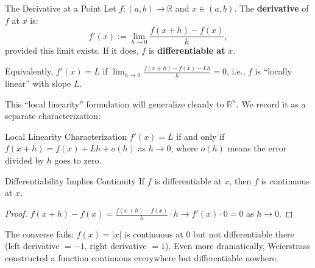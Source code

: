 \documentclass[12pt, openany]{book}
\theoremstyle{plain}
\theoremstyle{definition}
\theoremstyle{remark}
\newcommand{\R}{\mathbb{R}}
\begin{document}
\begin{defbox}{The Derivative at a Point}
Let $f : (a,b) \to \R$ and $x \in (a,b)$. The \textbf{derivative} of $f$ at $x$ is:
\[ f'(x) := \lim_{h \to 0} \frac{f(x+h) - f(x)}{h}, \]
provided this limit exists. If it does, $f$ is \textbf{differentiable at} $x$.

Equivalently, $f'(x) = L$ if $\lim_{h\to 0} \frac{f(x+h) - f(x) - Lh}{h} = 0$, i.e., $f$ is ``locally linear'' with slope $L$.
\end{defbox}
\color{black}

This ``local linearity'' formulation will generalize cleanly to $\R^n$. We record it as a separate characterization:

\begin{propbox}{Local Linearity Characterization}
$f'(x) = L$ if and only if $f(x + h) = f(x) + Lh + o(h)$ as $h \to 0$, where $o(h)$ means the error divided by $h$ goes to zero.
\end{propbox}
\color{black}

\begin{thmbox}{Differentiability Implies Continuity}
If $f$ is differentiable at $x$, then $f$ is continuous at $x$.
\end{thmbox}
\color{black}

\begin{proof}
$f(x+h) - f(x) = \frac{f(x+h)-f(x)}{h} \cdot h \to f'(x) \cdot 0 = 0$ as $h \to 0$.
\end{proof}

\begin{remarkbox}
The converse fails: $f(x) = |x|$ is continuous at $0$ but not differentiable there (left derivative $= -1$, right derivative $= 1$). Even more dramatically, Weierstrass constructed a function continuous everywhere but differentiable nowhere.
\end{remarkbox}
\color{black}
\end{document}
